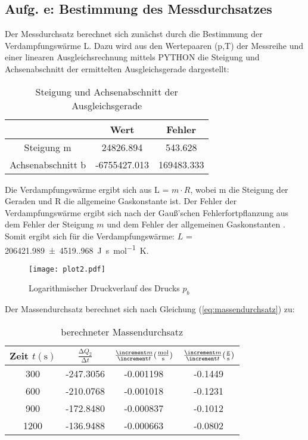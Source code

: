 {{\subsection{Aufg. e: Bestimmung des Messdurchsatzes}

Der Messdurchsatz berechnet sich zunächst durch die Bestimmung der Verdampfungswärme L.
Dazu wird aus den Wertepaaren (p,T) der Messreihe und einer linearen Ausgleichsrechnung mittels PYTHON die 
Steigung und Achsenabschnitt der ermittelten Ausgleichsgerade dargestellt: 

\begin{table}
  \centering
  \caption{Steigung und Achsenabschnitt der Ausgleichsgerade}
  \label{tab:güteziffern_t1}
  \begin{tabular}{c c c}
    \toprule
    {} &         Wert &      Fehler \\
    \midrule
    Steigung m        &    24826.894 &     543.628 \\
    Achsenabschnitt b & -6755427.013 &  169483.333 \\
    \bottomrule
  \end{tabular}
\end{table} 

Die Verdampfungswärme ergibt sich aus L = $m \cdot R$, wobei m die Steigung der Geraden und R die 
allgemeine Gaskonstante ist. Der Fehler der Verdampfungswärme ergibt sich nach der Gauß’schen Fehlerfortpflanzung
aus dem Fehler der Steigung $m$ und dem Fehler der allgemeinen Gaskonstanten \cite[467]{demtroeder1}. 
Somit ergibt sich für die Verdampfungswärme:
$L$ = \qty{206421.989(4519.968)}{\unit[per-mode=fraction]{\joule\second\per\mol\kelvin}}.

\begin{figure}
  \centering
  \texttt{[image: plot2.pdf]}
  \caption{Logarithmischer Druckverlauf des Drucks $p_{b}$}
  \label{fig:plot}
\end{figure}

Der Massendurchsatz berechnet sich nach Gleichung (\ref{eq:massendurchsatz}) zu:

\begin{table} 
  \centering
  \caption{berechneter Massendurchsatz}
  \label{tb:massendurchsaetze}
  \begin{tabular}{c c c c}
    \toprule
    {Zeit $t (\unit{\second})$} &
    $\frac{\increment Q_{2}}{\increment t}$ &
    {$\frac{\increment m}{\increment t} (\unit[per-mode=fraction]{\mol\per\second})$} &
    {$\frac{\increment m}{\increment t} (\unit[per-mode=fraction]{\gram\per\second})$} \\
    \midrule
      300 & -247.3056 &      -0.001198 &      -0.1449 \\
      600 & -210.0768 &      -0.001018 &      -0.1231 \\
      900 & -172.8480 &      -0.000837 &      -0.1012 \\
     1200 & -136.9488 &      -0.000663 &      -0.0802 \\
    \bottomrule
\end{tabular}
\end{table}

}}
